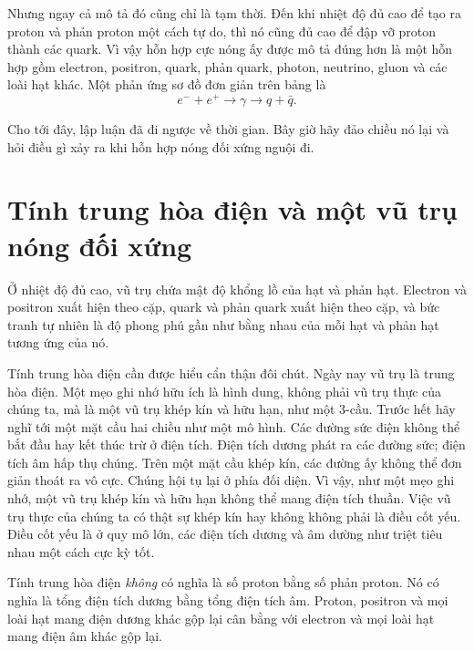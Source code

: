 Nhưng ngay cả mô tả đó cũng chỉ là tạm thời. Đến khi nhiệt độ đủ cao để tạo ra proton và phản proton một cách tự do, thì nó cũng đủ cao để đập vỡ proton thành các quark. Vì vậy hỗn hợp cực nóng ấy được mô tả đúng hơn là một hỗn hợp gồm electron, positron, quark, phản quark, photon, neutrino, gluon và các loài hạt khác. Một phản ứng sơ đồ đơn giản trên bảng là
\[
e^- + e^+ \to \gamma \to q + \bar q.
\]

\begin{classroomqa}
\end{classroomqa}

Cho tới đây, lập luận đã đi ngược về thời gian. Bây giờ hãy đảo chiều nó lại và hỏi điều gì xảy ra khi hỗn hợp nóng đối xứng nguội đi.

\section{Tính trung hòa điện và một vũ trụ nóng đối xứng}

Ở nhiệt độ đủ cao, vũ trụ chứa mật độ khổng lồ của hạt và phản hạt. Electron và positron xuất hiện theo cặp, quark và phản quark xuất hiện theo cặp, và bức tranh tự nhiên là độ phong phú gần như bằng nhau của mỗi hạt và phản hạt tương ứng của nó.

Tính trung hòa điện cần được hiểu cẩn thận đôi chút. Ngày nay vũ trụ là trung hòa điện. Một mẹo ghi nhớ hữu ích là hình dung, không phải vũ trụ thực của chúng ta, mà là một vũ trụ khép kín và hữu hạn, như một 3-cầu. Trước hết hãy nghĩ tới một mặt cầu hai chiều như một mô hình. Các đường sức điện không thể bắt đầu hay kết thúc trừ ở điện tích. Điện tích dương phát ra các đường sức; điện tích âm hấp thụ chúng. Trên một mặt cầu khép kín, các đường ấy không thể đơn giản thoát ra vô cực. Chúng hội tụ lại ở phía đối diện. Vì vậy, như một mẹo ghi nhớ, một vũ trụ khép kín và hữu hạn không thể mang điện tích thuần. Việc vũ trụ thực của chúng ta có thật sự khép kín hay không không phải là điều cốt yếu. Điều cốt yếu là ở quy mô lớn, các điện tích dương và âm dường như triệt tiêu nhau một cách cực kỳ tốt.

Tính trung hòa điện \emph{không} có nghĩa là số proton bằng số phản proton. Nó có nghĩa là tổng điện tích dương bằng tổng điện tích âm. Proton, positron và mọi loài hạt mang điện dương khác gộp lại cân bằng với electron và mọi loài hạt mang điện âm khác gộp lại.


